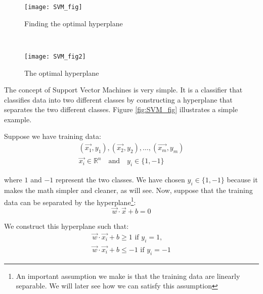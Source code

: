 
\begin{figure*}[!tb]
	\begin{subfigure}[t]{0.5\textwidth}
		\texttt{[image: SVM\_fig]}
		\caption{Finding the optimal hyperplane}
		\centering
		\label{fig:SVM_fig_a}
	\end{subfigure}%
	~
	\begin{subfigure}[t]{0.5\textwidth}
		\texttt{[image: SVM\_fig2]}
		\caption{The optimal hyperplane}
		\centering
		\label{fig:SVM_fig_b}
	\end{subfigure}%
	
	\caption{Figure \ref{fig:SVM_fig_a} shows $3$ different separating hyperplanes, however only one separates the data most naturally. This is called the optimal hyperplane. Figure \ref{fig:SVM_fig_b} shows the optimal hyperplane, the margin planes, and the support vectors.}
	\label{fig:SVM_fig}
\end{figure*}

The concept of Support Vector Machines is very simple. It is a classifier that classifies data into two different classes by constructing a hyperplane that separates the two different classes. Figure \ref{fig:SVM_fig} illustrates a simple example.

Suppose we have training data:
\begin{gather}
(\vec{x_1}, y_1),  (\vec{x_2}, y_2), \dots, (\vec{x_m}, y_m) \nonumber\\
\vec{x_i} \in \mathbb{R}^{n} \quad\text{and}\quad y_i \in \{1, -1\} \nonumber
\end{gather}

where $1$ and $-1$ represent the two classes. We have chosen $ y_i \in \{1, -1\}$ because it makes the math simpler and cleaner, as will see. Now, suppose that the training data can be separated by the hyperplane\footnote{An important assumption we make is that the training data are linearly separable. We will later see how we can satisfy this assumption}:
\begin{equation}
\vec{w}\cdot\vec{x} + b = 0 \label{eq:optimal-plane}
\end{equation}

We construct this hyperplane such that:
\begin{gather}
\vec{w}\cdot\vec{x_i} + b \geq 1 \text{ if $y_i = 1$,} \label{eq:class-1} \\
\vec{w}\cdot\vec{x_i} + b \leq -1 \text{ if $y_i = -1$} \label{eq:notclass-1} 
\end{gather}

